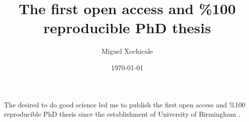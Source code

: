 \documentclass[11pt]{article}
\title{The first open access and \%100 reproducible PhD thesis}
\author{Miguel Xochicale}
\date{\today}
\begin{document}
\maketitle

The desired to do good science led me to publish the first 
open access and \%100 reproducible PhD thesis since the establishment 
of University of Birmingham \citep{xochicale2019-github}.



\end{document}
